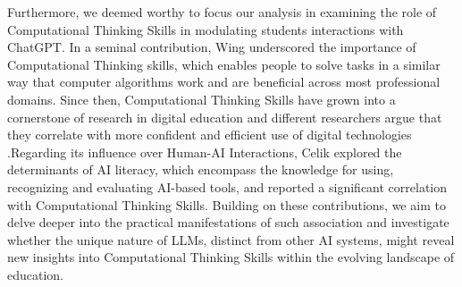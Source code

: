 \documentclass[sn-mathphys, Numbered]{sn-jnl}%
\theoremstyle{thmstyleone}%
\theoremstyle{thmstyletwo}%
\theoremstyle{thmstylethree}%
\begin{document}
Furthermore, we deemed worthy to focus our analysis in examining the role of Computational Thinking Skills in modulating students interactions with ChatGPT. In a seminal contribution, Wing \parencite*{wing_computational_2006} underscored the importance of Computational Thinking skills, which enables people to solve tasks in a similar way that computer algorithms work and are beneficial across most professional domains. Since then, Computational Thinking Skills have grown into a cornerstone of research in digital education and different researchers argue that they correlate with more confident and efficient use of digital technologies \parencite{cansu_overview_2019,grover_computational_2013, shute_demystifying_2017}.Regarding its influence over Human-AI Interactions, Celik \parencite*{celik_exploring_2023}  explored the determinants of AI literacy, which encompass the knowledge for using, recognizing and evaluating AI-based tools, and reported a significant correlation with Computational Thinking Skills. Building on these contributions, we aim to delve deeper into the practical manifestations of such association and investigate whether the unique nature of LLMs, distinct from other AI systems, might reveal new insights into Computational Thinking Skills within the evolving landscape of education. 


\end{document}
